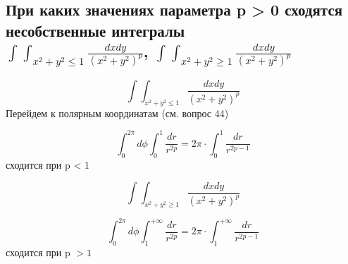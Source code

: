 
\subsection{При каких значениях параметра p > 0 сходятся несобственные интегралы\\ $\int\int_{x^2 + y^2 \leqslant 1}\frac{dxdy}{(x^2 + y^2)^p}$, $\int\int_{x^2 + y^2 \geqslant 1}\frac{dxdy}{(x^2 + y^2)^p}$}
\[\int\int_{x^2 + y^2 \leqslant 1}\frac{dxdy}{(x^2 + y^2)^p}\]
Перейдем к полярным координатам (см. вопрос 44)

\[\int_{0}^{2\pi}d\phi\int_{0}^{1}\frac{dr}{r^{2p}} = 2\pi\cdot\int_{0}^{1}\frac{dr}{r^{2p - 1}}\]
сходится при p < $1$

\[\int\int_{x^2 + y^2 \geqslant 1}\frac{dxdy}{(x^2 + y^2)^p}\]

\[\int_{0}^{2\pi}d\phi\int_{1}^{+\infty}\frac{dr}{r^{2p}} = 2\pi\cdot\int_{1}^{+\infty}\frac{dr}{r^{2p-1}}\]
сходится при p $>1$

